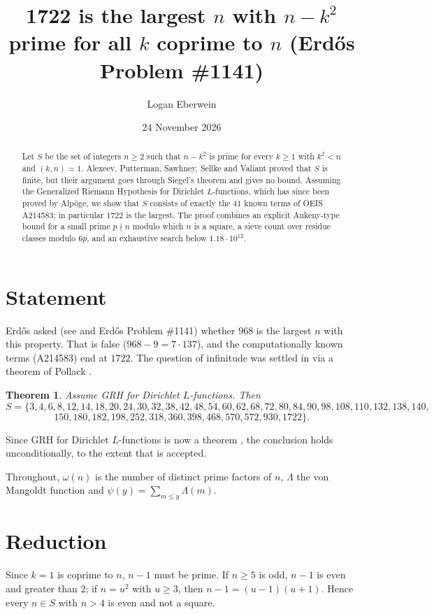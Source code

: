 \documentclass[11pt]{amsart}
\title{1722 is the largest $n$ with $n-k^2$ prime for all $k$ coprime to $n$ (Erd\H{o}s Problem \#1141)}
\author{Logan Eberwein}
\date{24 November 2026}
\newtheorem{theorem}{Theorem}
\theoremstyle{remark}\newtheorem*{remark}{Remark}
\begin{document}
\begin{abstract}
Let $S$ be the set of integers $n\ge 2$ such that $n-k^2$ is prime for every $k\ge1$ with $k^2<n$ and $(k,n)=1$. Alexeev, Putterman, Sawhney, Sellke and Valiant proved that $S$ is finite, but their argument goes through Siegel's theorem and gives no bound. Assuming the Generalized Riemann Hypothesis for Dirichlet $L$-functions, which has since been proved by Alp\"oge, we show that $S$ consists of exactly the $41$ known terms of OEIS A214583; in particular $1722$ is the largest. The proof combines an explicit Ankeny-type bound for a small prime $p\nmid n$ modulo which $n$ is a square, a sieve count over residue classes modulo $6p$, and an exhaustive search below $1.18\cdot10^{12}$.
\end{abstract}
\maketitle

\section{Statement}
Erd\H{o}s asked (see \cite{Va99} and Erd\H{o}s Problem \#1141) whether $968$ is the largest $n$ with this property. That is false ($968-9=7\cdot137$), and the computationally known terms (A214583) end at $1722$. The question of infinitude was settled in \cite{APSSV} via a theorem of Pollack \cite{Po17}.

\begin{theorem}\label{main}
Assume GRH for Dirichlet $L$-functions. Then
\[S=\{3,4,6,8,12,14,18,20,24,30,32,38,42,48,54,60,62,68,72,80,84,90,98,108,110,132,138,140,\]
\[150,180,182,198,252,318,360,398,468,570,572,930,1722\}.\]
\end{theorem}
Since GRH for Dirichlet $L$-functions is now a theorem \cite{Al26}, the conclusion holds unconditionally, to the extent that \cite{Al26} is accepted.

Throughout, $\omega(n)$ is the number of distinct prime factors of $n$, $\Lambda$ the von Mangoldt function and $\psi(y)=\sum_{m\le y}\Lambda(m)$.

\section{Reduction}
Since $k=1$ is coprime to $n$, $n-1$ must be prime. If $n\ge5$ is odd, $n-1$ is even and greater than $2$; if $n=u^2$ with $u\ge3$, then $n-1=(u-1)(u+1)$. Hence every $n\in S$ with $n>4$ is even and not a square.
\end{document}
